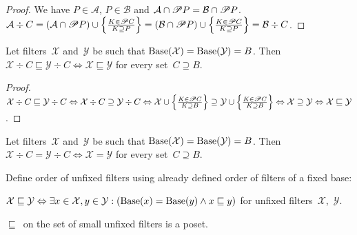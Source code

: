 \begin{proof}
We have $P\in\mathcal{A}$, $P\in\mathcal{B}$ and
$\mathcal{A}\cap\mathscr{P} P=\mathcal{B}\cap\mathscr{P} P$.
$\mathcal{A}\div C =
(\mathcal{A}\cap\mathscr{P} P)\cup\left\{ \frac{K\in\mathscr{P} C}{K\supseteq P}\right\} =
(\mathcal{B}\cap\mathscr{P} P)\cup\left\{ \frac{K\in\mathscr{P} C}{K\supseteq P}\right\} =
\mathcal{B}\div C$.
\end{proof}

\begin{lem}
Let filters~$\mathcal{X}$
and~$\mathcal{Y}$ be such that
$\operatorname{Base}(\mathcal{X})=\operatorname{Base}(\mathcal{Y})=B$. Then
$\mathcal{X}\div C\sqsubseteq\mathcal{Y}\div C
\Leftrightarrow \mathcal{X}\sqsubseteq\mathcal{Y}$ for every
set~$C\supseteq B$.
\end{lem}

\begin{proof}
$\mathcal{X}\div C\sqsubseteq\mathcal{Y}\div C\Leftrightarrow
\mathcal{X}\div C\supseteq\mathcal{Y}\div C\Leftrightarrow
\mathcal{X}\cup\left\{ \frac{K\in\mathscr{P} C}{K\supseteq B}\right\} \supseteq \mathcal{Y}\cup\left\{ \frac{K\in\mathscr{P} C}{K\supseteq B}\right\} \Leftrightarrow
\mathcal{X}\supseteq\mathcal{Y} \Leftrightarrow
\mathcal{X}\sqsubseteq\mathcal{Y}$.
\end{proof}

\begin{cor}
Let filters~$\mathcal{X}$
and~$\mathcal{Y}$ be such that
$\operatorname{Base}(\mathcal{X})=\operatorname{Base}(\mathcal{Y})=B$. Then
$\mathcal{X}\div C=\mathcal{Y}\div C
\Leftrightarrow \mathcal{X}=\mathcal{Y}$ for every
set~$C\supseteq B$.
\end{cor}

Define order of unfixed filters using already defined order
of filters of a fixed base:

\begin{defn}
$\mathcal{X}\sqsubseteq\mathcal{Y} \Leftrightarrow
\exists x\in\mathcal{X},y\in\mathcal{Y}:
(\operatorname{Base}(x)=\operatorname{Base}(y)\land x\sqsubseteq y)$ for unfixed
filters~$\mathcal{X}$,~$\mathcal{Y}$.
\end{defn}

\begin{thm}
$\sqsubseteq$~on the set of small unfixed filters is a poset.
\end{thm}

